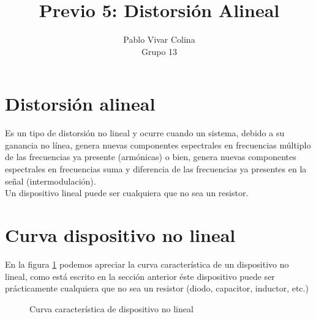 \documentclass{article}
\title{Previo 5: Distorsión Alineal}
\author{Pablo Vivar Colina\\
Grupo 13
}
\begin{document}
\maketitle

\section{Distorsión alineal}

Es un tipo de distorsión no lineal y ocurre cuando un sistema, debido a su ganancia  no línea,  genera  nuevas  componentes  espectrales  en  frecuencias  múltiplo  de  las  frecuencias  ya presente (armónicas) o bien, genera nuevas componentes espectrales en frecuencias suma y diferencia de las  frecuencias  ya  presentes  en  la  señal  (intermodulación).\citep{Distorsion}\\

Un dispositivo lineal puede ser cualquiera que no sea un resistor.\\

\section{Curva dispositivo no lineal}

En la figura \ref{fig:dispNoLin} podemos apreciar la curva característica de un dispositivo no lineal, como está escrito en la sección anterior éste dispositivo puede ser prácticamente cualquiera que no sea un resistor (diodo, capacitor, inductor, etc.)\\

\begin{figure}[h!]
    \centering
    
   
\caption{Curva característica de dispositivo no lineal}
    \label{fig:dispNoLin}
 
\end{figure}
\end{document}
